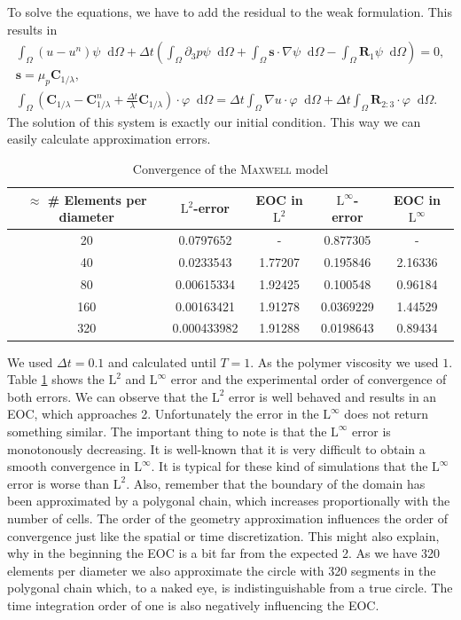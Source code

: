 \documentclass[12pt,a4paper,twoside, open=right]{scrreprt}
\theoremstyle{definition}
\theoremstyle{plain}
\newcommand{\bfs}{\bm{s}}
\newcommand{\bfC}{\bm{C}}
\newcommand{\bfR}{\bm{R}}
\newcommand{\D}{\mathop{}\!\mathrm{d}}
\begin{document}
To solve the equations, we have to add the residual to the weak formulation. This results in 
\begin{align}
\int_\Omega(u-u^n)\psi\D\Omega +\Delta t\left(\int_\Omega\partial_3 p\psi\D\Omega + \int_\Omega\bfs\cdot\nabla\psi\D\Omega-\int_\Omega \bfR_1\psi\D\Omega\right) = 0,\\
\bfs =\mu_p\bfC_{1/\lambda},\\
\int_\Omega(\bfC_{1/\lambda} - \bfC_{1/\lambda}^n +\frac{\Delta t}{\lambda}\bfC_{1/\lambda})\cdot\varphi\D\Omega = 
\Delta t\int_\Omega \nabla u\cdot\varphi\D\Omega+\Delta t\int_{\Omega}\bfR_{2:3}\cdot\varphi\D\Omega.
\end{align}
The solution of this system is exactly our initial condition. This way we can easily calculate approximation errors. 
\begin{table}
    \centering
    \begin{tabular}{c|c|c|c|c}
        $\approx$ \# Elements per diameter& $\mathrm{L}^2$-error&EOC in $\mathrm{L}^2$&$\mathrm{L}^\infty$-error &EOC in $\mathrm{L}^\infty$\\
        \hline
        20 & 0.0797652 & - & 0.877305 & -\\
        40 & 0.0233543 & 1.77207 & 0.195846 & 2.16336\\
        80 & 0.00615334 & 1.92425 & 0.100548 & 0.96184\\
        160 & 0.00163421 & 1.91278 & 0.0369229 & 1.44529\\
        320 & 0.000433982 & 1.91288 & 0.0198643 & 0.89434
    \end{tabular}
    \caption{Convergence of the \textsc{Maxwell} model}
    \label{tab:maxwellconv}
\end{table}

We used $\Delta t = 0.1$ and calculated until $T=1$. As the polymer viscosity we used $1$. Table \ref{tab:maxwellconv} shows the $\mathrm{L}^2$ and $\mathrm{L}^\infty$ error and the experimental order of convergence of both errors. We can observe that the $\mathrm{L}^2$ error is well behaved and results in an EOC, which approaches 2. Unfortunately the error in the $\mathrm{L}^\infty$ does not return something similar. The important thing to note is that the $\mathrm{L}^\infty$ error is monotonously decreasing. It is well-known that it is very difficult to obtain a smooth convergence in $\mathrm{L}^\infty$. It is typical for these kind of simulations that the $\mathrm{L}^\infty$ error is worse than $\mathrm{L}^2$. Also, remember that the boundary of the domain has been approximated by a polygonal chain, which increases proportionally with the number of cells. The order of the geometry approximation influences the order of convergence just like the spatial or time discretization. This might also explain, why in the beginning the EOC is a bit far from the expected 2. As we have 320 elements per diameter we also approximate the circle with 320 segments in the polygonal chain which, to a naked eye, is indistinguishable from a true circle. The time integration order of one is also negatively influencing the EOC. 
\end{document}
